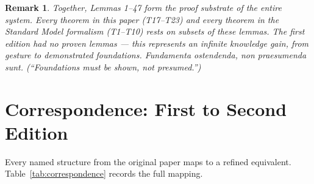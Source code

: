 \documentclass[
  aps,
  prd,
  preprint,
  superscriptaddress,
  nofootinbib,
  floatfix,
  longbibliography
]{revtex4-2}
\newtheorem{remark}{Remark}
\newcommand{\lat}[1]{\textit{#1}}
\begin{document}
\begin{remark}
Together, Lemmas 1--47 form the \emph{proof substrate}
of the entire system.
Every theorem in this paper (T17--T23) and every
theorem in the Standard Model formalism (T1--T10)
rests on subsets of these lemmas.
The first edition had no proven lemmas — this
represents an infinite knowledge gain, from gesture
to demonstrated foundations.
\lat{Fundamenta ostendenda, non praesumenda sunt.}
(``Foundations must be shown, not presumed.'')
\end{remark}

\section{Correspondence: First to Second
         Edition}\label{sec:correspondence}

Every named structure from the original paper maps to a
refined equivalent.
Table~\ref{tab:correspondence} records the full mapping.
\end{document}
